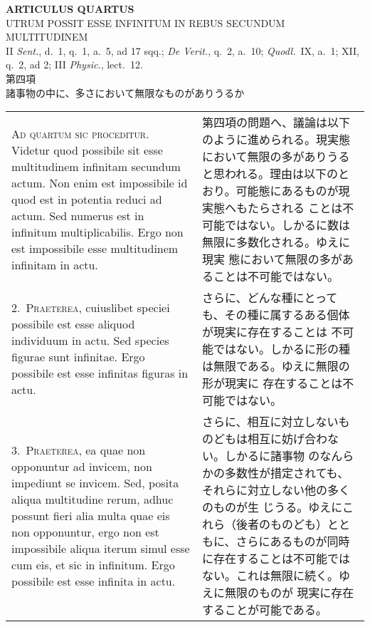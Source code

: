 \documentclass[10pt]{jsarticle} %
\begin{document}
\newpage
{}
 

\begin{center}
 {\Large {\bf ARTICULUS QUARTUS}}\\
 {\large UTRUM POSSIT ESSE INFINITUM IN REBUS SECUNDUM MULTITUDINEM}\\
 {\footnotesize II {\itshape Sent.}, d.~1, q.~1, a.~5, ad 17 sqq.;
 {\itshape De Verit.}, q.~2, a.~10; {\itshape Quodl.}~IX, a.~1; XII,
 q.~2, ad 2; III {\itshape Physic.}, lect.~12.}\\
 {\Large 第四項\\諸事物の中に、多さにおいて無限なものがありうるか}
\end{center}

\begin{longtable}{p{21em}p{21em}}
{\huge A}{\scshape d quartum sic proceditur}. Videtur quod possibile sit esse
 multitudinem infinitam secundum actum. Non enim est impossibile id quod
 est in potentia reduci ad actum. Sed numerus est in infinitum
 multiplicabilis. Ergo non est impossibile esse multitudinem infinitam
 in actu.

&

第四項の問題へ、議論は以下のように進められる。現実態において無限の多がありうる
 と思われる。理由は以下のとおり。可能態にあるものが現実態ヘもたらされる
 ことは不可能ではない。しかるに数は無限に多数化される。ゆえに現実
 態において無限の多があることは不可能ではない。


\\


2.~{\scshape Praeterea}, cuiuslibet speciei possibile est esse aliquod
 individuum in actu. Sed species figurae sunt infinitae. Ergo possibile
 est esse infinitas figuras in actu.

&

さらに、どんな種にとっても、その種に属するある個体が現実に存在することは
 不可能ではない。しかるに形の種は無限である。ゆえに無限の形が現実に
 存在することは不可能ではない。




\\

3.~{\scshape Praeterea}, ea quae non opponuntur ad invicem, non impediunt se
 invicem. Sed, posita aliqua multitudine rerum, adhuc possunt fieri alia
 multa quae eis non opponuntur, ergo non est impossibile aliqua iterum
 simul esse cum eis, et sic in infinitum. Ergo possibile est esse
 infinita in actu.

&

さらに、相互に対立しないものどもは相互に妨げ合わない。しかるに諸事物
 のなんらかの多数性が措定されても、それらに対立しない他の多くのものが生
 じうる。ゆえにこれら（後者のものども）とともに、さらにあるものが同時
 に存在することは不可能ではない。これは無限に続く。ゆえに無限のものが
 現実に存在することが可能である。



\end{longtable}
\end{document}
